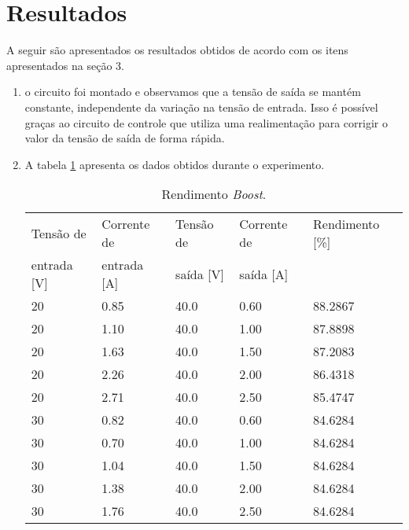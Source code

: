 \newpage
\section{Resultados}

  A seguir são apresentados os resultados obtidos de acordo com os itens apresentados na seção 3.
  
  \begin{enumerate}
    \item o circuito foi montado e observamos que a tensão de saída se mantém constante, independente da variação na tensão de entrada. Isso é possível graças ao circuito de controle que utiliza uma realimentação para corrigir o valor da tensão de saída de forma rápida.
    
    \item A tabela \ref{tab:boost2} apresenta os dados obtidos durante o experimento.
    
    \begin{small}
      \begin{table}[H]
        \begin{center}
          \caption{Rendimento \textit{Boost}.}
          \begin{tabular}{l|l|l|l|l}
            \hline
            Tensão de   &  Corrente de 	& Tensão de & Corrente de	& Rendimento [\%]	\\
            entrada [V] &  entrada [A] 	& saída [V] & saída [A]  	& \\
            \hline
            20 		& 0.85			& 40.0		& 0.60			& 88.2867	\\
            \hline
            20		& 1.10			& 40.0		& 1.00			& 87.8898	\\
            \hline
            20		& 1.63			& 40.0		& 1.50			& 87.2083	\\
            \hline
            20		& 2.26			& 40.0		& 2.00			& 86.4318	\\
            \hline
            20		& 2.71			& 40.0		& 2.50			& 85.4747	\\
            \hline
            30		& 0.82			& 40.0		& 0.60			& 84.6284	\\
            \hline
            30		& 0.70			& 40.0		& 1.00			& 84.6284	\\
            \hline
            30		& 1.04			& 40.0		& 1.50			& 84.6284	\\
            \hline
            30		& 1.38			& 40.0		& 2.00			& 84.6284	\\
            \hline
            30		& 1.76			& 40.0		& 2.50			& 84.6284	\\
            \hline
          \end{tabular}
          \label{tab:boost2}
        \end{center}
      \end{table}
    \end{small}
    

\end{enumerate}
